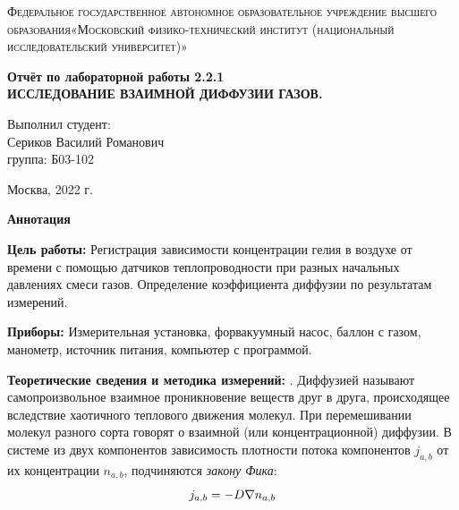 \documentclass[a4paper, 12pt]{article}%
\begin{document}
	\begin{titlepage}
		\begin{center}
			\textsc{Федеральное государственное автономное образовательное учреждение высшего образования«Московский физико-технический институт (национальный исследовательский университет)»\\[5mm]
			}
			
			\vfill
			
			\textbf{Отчёт по лабораторной работы 2.2.1\\[3mm]
			ИССЛЕДОВАНИЕ ВЗАИМНОЙ
			ДИФФУЗИИ ГАЗОВ.
				\\[50mm]
			}
			
		\end{center}
		
		\hfill
		\begin{minipage}{.5\textwidth}
			Выполнил студент:\\[2mm]
			Сериков Василий Романович\\[2mm]
			группа: Б03-102\\[5mm]
			
		\end{minipage}
		\vfill
		\begin{center}
			Москва, 2022 г.
		\end{center}
		
	\end{titlepage}
	
	\newpage

\textbf{Аннотация}


\textbf{Цель работы:} Регистрация зависимости концентрации гелия в воздухе от времени с помощью датчиков теплопроводности при разных начальных давлениях смеси газов. Определение коэффициента диффузии по результатам измерений.

\textbf{Приборы:} Измерительная установка, форвакуумный насос, баллон с газом, манометр, источник питания, компьютер с программой.

\textbf{Теоретические сведения и методика измерений:} . Диффузией называют самопроизвольное взаимное проникновение веществ друг в друга, происходящее вследствие хаотичного теплового движения молекул. При перемешивании молекул разного сорта говорят о взаимной (или концентрационной) диффузии.
В системе из двух компонентов зависимость плотности потока компонентов $j_{a,b}$ от их концентрации $n_{a,b}$, подчиняются \textit{закону Фика}:
\begin{equation*}
	j_{a,b} = -D\nabla{n_{a,b}}\\
\end{equation*}
\end{document}
